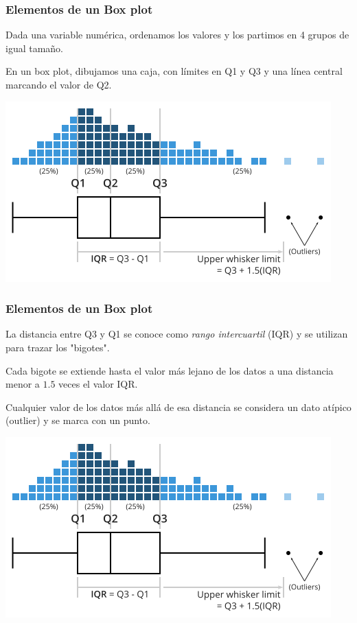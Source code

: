 \documentclass[aspectratio=169,12pt]{beamer}
\begin{document}

\begin{frame}
\frametitle{Elementos de un Box plot}

Dada una variable numérica, ordenamos los valores y los partimos en 4 grupos de igual tamaño.

En un box plot, dibujamos una caja, con límites en Q1 y Q3 y una línea central marcando el valor de Q2.

\begin{center}
\includegraphics[scale=.45]{clase4-box-plot-construction.png}
\end{center}

\end{frame}


\begin{frame}
\frametitle{Elementos de un Box plot}

La distancia entre Q3 y Q1 se conoce como \emph{rango intercuartil} (IQR) y se utilizan para trazar los "bigotes".

Cada bigote se extiende hasta el valor más lejano de los datos a una distancia menor a $1.5$ veces el valor IQR.

Cualquier valor de los datos más allá de esa distancia se considera un dato atípico (outlier) y se marca con un punto.

\begin{center}
\includegraphics[scale=.35]{clase4-box-plot-construction.png}
\end{center}

\end{frame}
\end{document}
